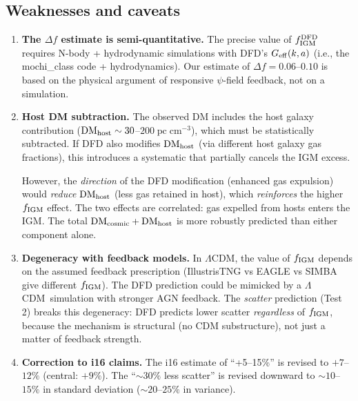 \documentclass[11pt]{article}
\newcommand{\LCDM}{$\Lambda$CDM}
\newcommand{\fIGM}{f_{\rm IGM}}
\newcommand{\Geff}{G_{\rm eff}}
\newcommand{\pc}{\;\mathrm{pc\;cm}^{-3}}
\begin{document}
\subsection{Weaknesses and caveats}

\begin{enumerate}
\item \textbf{The $\Delta f$ estimate is semi-quantitative.}  The
  precise value of $\fIGM^{\rm DFD}$ requires N-body + hydrodynamic
  simulations with DFD's $\Geff(k,a)$ (i.e., the mochi\_class code
  + hydrodynamics).  Our estimate of $\Delta f = 0.06$--$0.10$ is
  based on the physical argument of responsive $\psi$-field feedback,
  not on a simulation.

\item \textbf{Host DM subtraction.}  The observed DM includes the
  host galaxy contribution ($\mathrm{DM}_{\rm host} \sim 30$--$200\pc$),
  which must be statistically subtracted.  If DFD also modifies
  $\mathrm{DM}_{\rm host}$ (via different host galaxy gas fractions),
  this introduces a systematic that partially cancels the IGM excess.

  However, the \emph{direction} of the DFD modification (enhanced
  gas expulsion) would \emph{reduce} $\mathrm{DM}_{\rm host}$
  (less gas retained in host), which \emph{reinforces} the higher
  $\fIGM$ effect.  The two effects are correlated: gas expelled from
  hosts enters the IGM.  The total $\mathrm{DM}_{\rm cosmic} +
  \mathrm{DM}_{\rm host}$ is more robustly predicted than either
  component alone.

\item \textbf{Degeneracy with feedback models.}  In \LCDM, the
  value of $\fIGM$ depends on the assumed feedback prescription
  (IllustrisTNG vs EAGLE vs SIMBA give different $\fIGM$).  The
  DFD prediction could be mimicked by a \LCDM\ simulation with
  stronger AGN feedback.  The \emph{scatter} prediction (Test 2)
  breaks this degeneracy: DFD predicts lower scatter \emph{regardless}
  of $\fIGM$, because the mechanism is structural (no CDM
  substructure), not just a matter of feedback strength.

\item \textbf{Correction to i16 claims.}  The i16 estimate of
  ``+5--15\%'' is revised to $+7$--$12\%$ (central: $+9\%$).  The
  ``$\sim 30\%$ less scatter'' is revised downward to $\sim 10$--$15\%$
  in standard deviation ($\sim 20$--$25\%$ in variance).
\end{enumerate}

\end{document}
